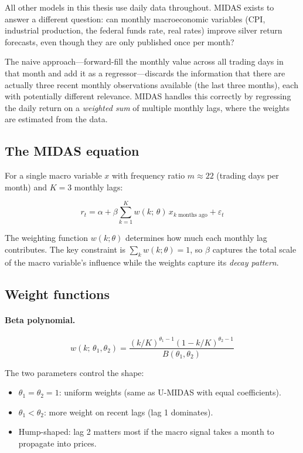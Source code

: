 \documentclass[12pt, a4paper]{article}
\begin{document}
All other models in this thesis use daily data throughout. MIDAS exists to answer a
different question: can monthly macroeconomic variables (CPI, industrial production,
the federal funds rate, real rates) improve silver return forecasts, even though they
are only published once per month?

The naive approach---forward-fill the monthly value across all trading days in that
month and add it as a regressor---discards the information that there are actually
three recent monthly observations available (the last three months), each with
potentially different relevance. MIDAS handles this correctly by regressing the daily
return on a \emph{weighted sum} of multiple monthly lags, where the weights are
estimated from the data.

\subsection{The MIDAS equation}

For a single macro variable $x$ with frequency ratio $m \approx 22$ (trading days per
month) and $K = 3$ monthly lags:

\begin{equation}
  r_t = \alpha + \beta \sum_{k=1}^{K} w(k;\, \theta)\, x_{k\text{ months ago}} + \varepsilon_t
  \label{eq:midas_full}
\end{equation}

\noindent The weighting function $w(k; \theta)$ determines how much each monthly lag
contributes. The key constraint is $\sum_k w(k;\theta) = 1$, so $\beta$ captures the
total scale of the macro variable's influence while the weights capture its
\emph{decay pattern}.

\subsection{Weight functions}

\paragraph{Beta polynomial.}
\begin{equation}
  w(k;\, \theta_1, \theta_2) =
    \frac{(k/K)^{\theta_1 - 1}(1 - k/K)^{\theta_2 - 1}}{B(\theta_1, \theta_2)}
\end{equation}

The two parameters control the shape:
\begin{itemize}
  \item $\theta_1 = \theta_2 = 1$: uniform weights (same as U-MIDAS with equal
    coefficients).
  \item $\theta_1 < \theta_2$: more weight on recent lags (lag 1 dominates).
  \item Hump-shaped: lag 2 matters most if the macro signal takes a month to
    propagate into prices.
\end{itemize}
\end{document}
